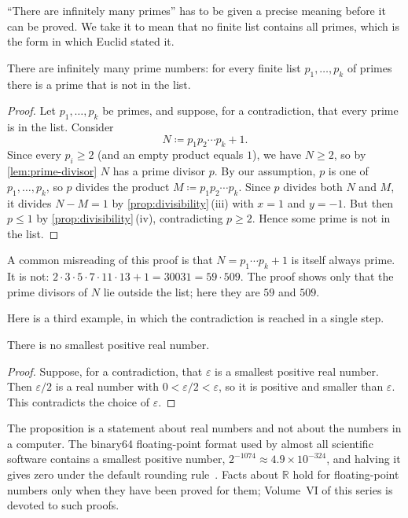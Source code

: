 ``There are infinitely many primes'' has to be given a precise meaning before it can be proved. We take it to mean that no finite list contains all primes, which is the form in which Euclid stated it.

\begin{theorem}[Euclid]
\label{thm:euclid}
There are infinitely many prime numbers: for every finite list $p_1,\ldots,p_k$ of primes there is a prime that is not in the list.
\end{theorem}

\begin{proof}
Let $p_1,\ldots,p_k$ be primes, and suppose, for a contradiction, that every prime is in the list. Consider
\[
N\coloneqq p_1p_2\cdots p_k+1 .
\]
Since every $p_i\ge2$ (and an empty product equals $1$), we have $N\ge2$, so by \cref{lem:prime-divisor} $N$ has a prime divisor $p$. By our assumption, $p$ is one of $p_1,\ldots,p_k$, so $p$ divides the product $M\coloneqq p_1p_2\cdots p_k$. Since $p$ divides both $N$ and $M$, it divides $N-M=1$ by \cref{prop:divisibility}\,(iii) with $x=1$ and $y=-1$. But then $p\le1$ by \cref{prop:divisibility}\,(iv), contradicting $p\ge2$. Hence some prime is not in the list.
\end{proof}

A common misreading of this proof is that $N=p_1\cdots p_k+1$ is itself always prime. It is not: $2\cdot3\cdot5\cdot7\cdot11\cdot13+1=30031=59\cdot509$. The proof shows only that the prime divisors of $N$ lie outside the list; here they are $59$ and $509$.

Here is a third example, in which the contradiction is reached in a single step.

\begin{proposition}
\label{prop:no-smallest}
There is no smallest positive real number.
\end{proposition}

\begin{proof}
Suppose, for a contradiction, that $\varepsilon$ is a smallest positive real number. Then $\varepsilon/2$ is a real number with $0<\varepsilon/2<\varepsilon$, so it is positive and smaller than $\varepsilon$. This contradicts the choice of $\varepsilon$.
\end{proof}

The proposition is a statement about real numbers and not about the numbers in a computer. The binary64 floating-point format used by almost all scientific software contains a smallest positive number, $2^{-1074}\approx4.9\times10^{-324}$, and halving it gives zero under the default rounding rule~\cite{ieee754-2019}. Facts about $\mathbb R$ hold for floating-point numbers only when they have been proved for them; Volume~VI of this series is devoted to such proofs.

